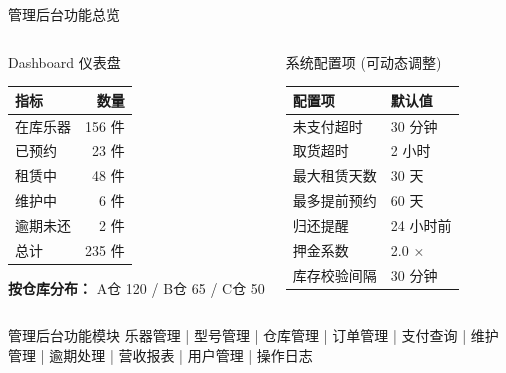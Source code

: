 \documentclass[aspectratio=169,10pt]{beamer}
\newcommand{\con}[1]{\textcolor{negative}{#1}}
\begin{document}
\begin{frame}{管理后台功能总览}
  \vspace{4pt}
  \begin{columns}[T]
    \begin{block}{Dashboard 仪表盘}
      {\footnotesize
      \begin{tabular}{lr}
        \toprule
        \textbf{指标} & \textbf{数量} \\
        \midrule
        在库乐器 & 156 件 \\
        已预约   &  23 件 \\
        租赁中   &  48 件 \\
        维护中   &   6 件 \\
        逾期未还  & \con{2 件} \\
        总计     & 235 件 \\
        \bottomrule
      \end{tabular}

      \vspace{4pt}
      \textbf{按仓库分布：} A仓 120 / B仓 65 / C仓 50
      }
    \end{block}

    \begin{block}{系统配置项 (可动态调整)}
      {\footnotesize
      \begin{tabular}{ll}
        \toprule
        \textbf{配置项} & \textbf{默认值} \\
        \midrule
        未支付超时   & 30 分钟 \\
        取货超时     & 2 小时 \\
        最大租赁天数  & 30 天 \\
        最多提前预约  & 60 天 \\
        归还提醒     & 24 小时前 \\
        押金系数     & 2.0 × \\
        库存校验间隔  & 30 分钟 \\
        \bottomrule
      \end{tabular}
      }
    \end{block}
  \end{columns}

  \vspace{4pt}
  \begin{alertblock}{管理后台功能模块}
    {\small 乐器管理 | 型号管理 | 仓库管理 | 订单管理 | 支付查询 | 维护管理 | 逾期处理 | 营收报表 | 用户管理 | 操作日志}
  \end{alertblock}
\end{frame}
\end{document}

